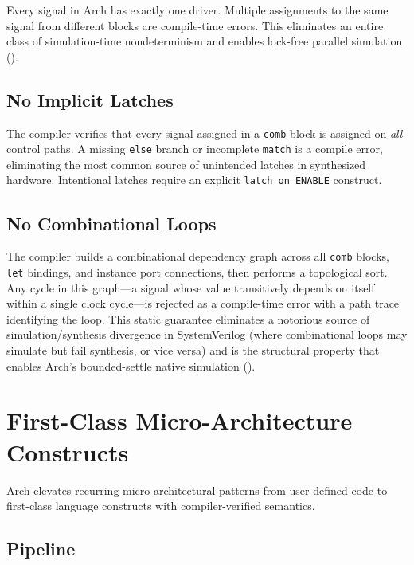 \documentclass[11pt,twocolumn]{article}
\begin{document}
Every signal in Arch has exactly one driver. Multiple assignments to the same signal from different blocks are compile-time errors. This eliminates an entire class of simulation-time nondeterminism and enables lock-free parallel simulation ().

\subsection{No Implicit Latches}

The compiler verifies that every signal assigned in a \texttt{comb} block is assigned on \emph{all} control paths. A missing \texttt{else} branch or incomplete \texttt{match} is a compile error, eliminating the most common source of unintended latches in synthesized hardware. Intentional latches require an explicit \texttt{latch on ENABLE} construct.

\subsection{No Combinational Loops}

The compiler builds a combinational dependency graph across all \texttt{comb} blocks, \texttt{let} bindings, and instance port connections, then performs a topological sort. Any cycle in this graph---a signal whose value transitively depends on itself within a single clock cycle---is rejected as a compile-time error with a path trace identifying the loop. This static guarantee eliminates a notorious source of simulation/synthesis divergence in SystemVerilog (where combinational loops may simulate but fail synthesis, or vice versa) and is the structural property that enables Arch's bounded-settle native simulation ().

\section{First-Class Micro-Architecture Constructs}\label{sec:constructs}

Arch elevates recurring micro-architectural patterns from user-defined code to first-class language constructs with compiler-verified semantics.

\subsection{Pipeline}
\end{document}
